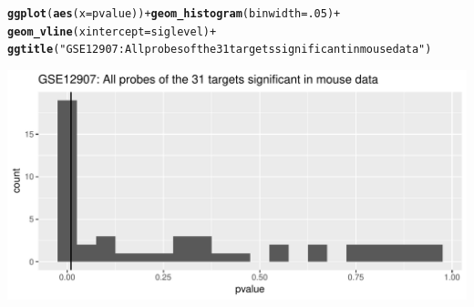 \documentclass{article}\usepackage[]{graphicx}\usepackage[]{color}
\makeatletter
\def\maxwidth{ %
  \ifdim\Gin@nat@width>\linewidth
    \linewidth
  \else
    \Gin@nat@width
  \fi
}
\newcommand{\hlnum}[1]{\textcolor[rgb]{0.686,0.059,0.569}{#1}}%
\newcommand{\hlstr}[1]{\textcolor[rgb]{0.192,0.494,0.8}{#1}}%
\newcommand{\hlopt}[1]{\textcolor[rgb]{0,0,0}{#1}}%
\newcommand{\hlstd}[1]{\textcolor[rgb]{0.345,0.345,0.345}{#1}}%
\newcommand{\hlkwc}[1]{\textcolor[rgb]{0.333,0.667,0.333}{#1}}%
\newcommand{\hlkwd}[1]{\textcolor[rgb]{0.737,0.353,0.396}{\textbf{#1}}}%
\newenvironment{kframe}{%
 \def\at@end@of@kframe{}%
 \ifinner\ifhmode%
  \def\at@end@of@kframe{\end{minipage}}%
  \begin{minipage}{\columnwidth}%
 \fi\fi%
 \def\FrameCommand##1{\hskip\@totalleftmargin \hskip-\fboxsep
 \colorbox{shadecolor}{##1}\hskip-\fboxsep
     \hskip-\linewidth \hskip-\@totalleftmargin \hskip\columnwidth}%
 \MakeFramed {\advance\hsize-\width
   \@totalleftmargin\z@ \linewidth\hsize
   \@setminipage}}%
 {\par\unskip\endMakeFramed%
 \at@end@of@kframe}
\newenvironment{knitrout}{}{} %
\makeatother
\begin{document}
\begin{knitrout}
\begin{kframe}
\begin{alltt}
  \hlkwd{ggplot}\hlstd{(}\hlkwd{aes}\hlstd{(}\hlkwc{x}\hlstd{=pvalue))} \hlopt{+} \hlkwd{geom_histogram}\hlstd{(}\hlkwc{binwidth} \hlstd{=} \hlnum{.05}\hlstd{)} \hlopt{+}
  \hlkwd{geom_vline}\hlstd{(}\hlkwc{xintercept} \hlstd{= siglevel)} \hlopt{+}
  \hlkwd{ggtitle}\hlstd{(}\hlstr{"GSE12907: All probes of the 31 targets significant in mouse data"}\hlstd{)}
\end{alltt}
\end{kframe}
\includegraphics[width=\maxwidth]{figure/unnamed-chunk-25-1} 

\end{knitrout}
\end{document}
